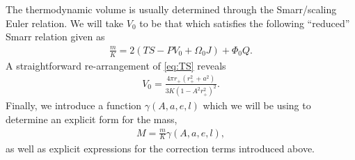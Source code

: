 \documentclass[
twoside,
openright,
frontopenright,
]{dmathesis}
\begin{document}
The thermodynamic volume is usually determined through the Smarr/scaling Euler
relation. We will take $V_0$ to be that which satisfies the following
``reduced'' Smarr relation given as
\begin{align}\label{eq:Smarr0}
\frac{m}{K} = 2(TS-PV_0+\Omega_0 J)+\Phi_0 Q.
\end{align}
A straightforward re-arrangement of \cref{eq:TS} reveals
\begin{align}\label{eq:V0}
V_0 = \frac{4\pi r_+ (r_+^2+a^2)}{3 K (1-A^2 r_+^2)^2}.
\end{align}
Finally, we introduce a function $\gamma(A,a,e,l)$ which we will be using to
determine an explicit form for the mass,
\begin{align}\label{eq:defM}
M=\frac{m}{K} \gamma(A,a,e,l),
\end{align}
as well as explicit expressions for the correction terms introduced above.
\end{document}
